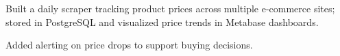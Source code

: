 
\vspace{3pt}
\begin{resume_list}
  \item Built a daily scraper tracking product prices across multiple e-commerce sites; stored in PostgreSQL and visualized price trends in Metabase dashboards.
  \item Added alerting on price drops to support buying decisions.
\end{resume_list}
